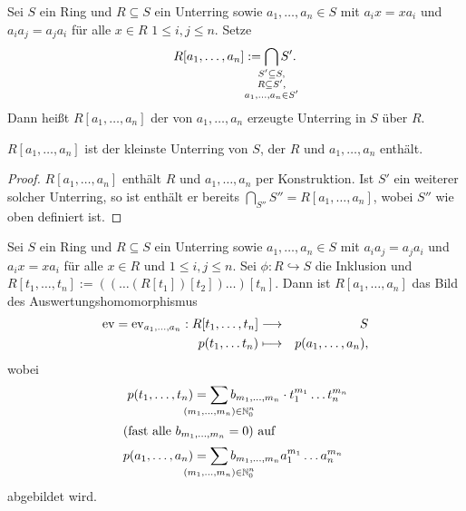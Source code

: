 \documentclass[12pt,a4paper]{scrartcl}
\begin{document}
\begin{defi}
	Sei $S$ ein Ring und $R\subseteq S$ ein Unterring sowie $a_1,\dots,a_n\in S$ mit $a_ix = xa_i$ und $a_ia_j = a_ja_i$ für alle $x\in R$ $1\leq i,j\leq n$. Setze
	\[ R[a_1,\dots,a_n] := \bigcap_{\mathclap{\substack{S'\subseteq S,\\R\subseteq S',\\ a_1,\dots,a_n\in S'}}}S'.\]
	Dann heißt $R[a_1,\dots,a_n]$ der von $a_1,\dots,a_n$ erzeugte Unterring in $S$ über $R$. 
\end{defi}


\begin{bem}
	$R[a_1,\dots,a_n]$ ist der kleinste Unterring von $S$, der $R$ und $a_1,\dots,a_n$ enthält.
\end{bem}
\begin{proof}
	$R[a_1,\dots,a_n]$ enthält $R$ und $a_1,\dots,a_n$ per Konstruktion.
	Ist $S'$ ein weiterer solcher Unterring, so ist enthält er bereits $\bigcap_{S''}S'' = R[a_1,\dots,a_n]$, wobei $S''$ wie oben definiert ist.
\end{proof}

\begin{satz}\label{thm:evalpolyring}
	Sei $S$ ein Ring und $R\subseteq S$ ein Unterring sowie $a_1,\dots,a_n\in S$ mit $a_ia_j = a_ja_i$ und $a_ix = xa_i$ für alle $x\in R$ und $1\leq i,j\leq n$. Sei $\phi \colon R\hookrightarrow S$ die Inklusion und $R[t_1,\dots, t_n] := ((\dots(R[t_1])[t_2])\dots)[t_n]$. Dann ist $R[a_1,\dots,a_n]$ das Bild des Auswertungshomomorphismus 
	\begin{eqnarray*}
		\operatorname{ev} = \operatorname{ev}_{a_1,\dots,a_n}: R[t_1,\dots,t_n] & \longrightarrow & S\\
		p(t_1,\dots t_n) & \longmapsto & p(a_1, \dots, a_n),
	\end{eqnarray*}
	wobei
	\begin{align*}
		p (t_1,\dots, t_n) &= \sum_{\mathclap{(m_1,\dots,m_n)\in\IN_{0}^n}}b_{m_1,\dots,m_n}\cdot t_1^{m_1}\dots t_n^{m_n} \\
		\intertext{(fast alle $b_{m_1,\dots,m_n} = 0$) auf}
		p(a_1,\dots, a_n ) &= \sum_{\mathclap{(m_1,\dots, m_n)\in \IN_0^n}} b_{m_1,\dots,m_n}a_1^{m_1}\dots a_n^{m_n}
	\end{align*}
	abgebildet wird.
\end{satz}
\end{document}
